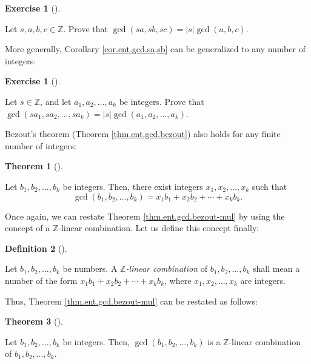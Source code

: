 \documentclass[numbers=enddot,12pt,final,onecolumn,notitlepage]{scrartcl}%
\newcounter{exer}
\numberwithin{exer}{subsection}
\theoremstyle{definition}
\newtheorem{theo}{Theorem}[subsection]
\newenvironment{theorem}[1][]
{\begin{theo}[#1]\begin{leftbar}}
{\end{leftbar}\end{theo}}
\newtheorem{defi}[theo]{Definition}
\newenvironment{definition}[1][]
{\begin{defi}[#1]\begin{leftbar}}
{\end{leftbar}\end{defi}}
\newtheorem{exmp}[exer]{Exercise}
\newenvironment{exercise}[1][]
{\begin{exmp}[#1]\begin{leftbar}}
{\end{leftbar}\end{exmp}}
\begin{document}
\begin{exercise}
\label{exe.ent.gcd.sa,sb,sc}Let $s,a,b,c\in\mathbb{Z}$. Prove that
$\gcd\left(  sa,sb,sc\right)  =\left\vert s\right\vert \gcd\left(
a,b,c\right)  $.
\end{exercise}

More generally, Corollary \ref{cor.ent.gcd.sa,sb} can be generalized to any
number of integers:

\begin{exercise}
\label{exe.ent.gcd.sak}Let $s\in\mathbb{Z}$, and let $a_{1},a_{2},\ldots
,a_{k}$ be integers. Prove that $\gcd\left(  sa_{1},sa_{2},\ldots
,sa_{k}\right)  =\left\vert s\right\vert \gcd\left(  a_{1},a_{2},\ldots
,a_{k}\right)  $.
\end{exercise}

Bezout's theorem (Theorem \ref{thm.ent.gcd.bezout}) also holds for any finite
number of integers:

\begin{theorem}
\label{thm.ent.gcd.bezout-mul}Let $b_{1},b_{2},\ldots,b_{k}$ be integers.
Then, there exist integers $x_{1},x_{2},\ldots,x_{k}$ such that%
\[
\gcd\left(  b_{1},b_{2},\ldots,b_{k}\right)  =x_{1}b_{1}+x_{2}b_{2}%
+\cdots+x_{k}b_{k}.
\]

\end{theorem}

Once again, we can restate Theorem \ref{thm.ent.gcd.bezout-mul} by using the
concept of a $\mathbb{Z}$-linear combination. Let us define this concept finally:

\begin{definition}
Let $b_{1},b_{2},\ldots,b_{k}$ be numbers. A $\mathbb{Z}$\textit{-linear
combination} of $b_{1},b_{2},\ldots,b_{k}$ shall mean a number of the form
$x_{1}b_{1}+x_{2}b_{2}+\cdots+x_{k}b_{k}$, where $x_{1},x_{2},\ldots,x_{k}$
are integers.
\end{definition}

Thus, Theorem \ref{thm.ent.gcd.bezout-mul} can be restated as follows:

\begin{theorem}
\label{thm.ent.gcd.bezout-mul'}Let $b_{1},b_{2},\ldots,b_{k}$ be integers.
Then, $\gcd\left(  b_{1},b_{2},\ldots,b_{k}\right)  $ is a $\mathbb{Z}$-linear
combination of $b_{1},b_{2},\ldots,b_{k}$.
\end{theorem}
\end{document}
